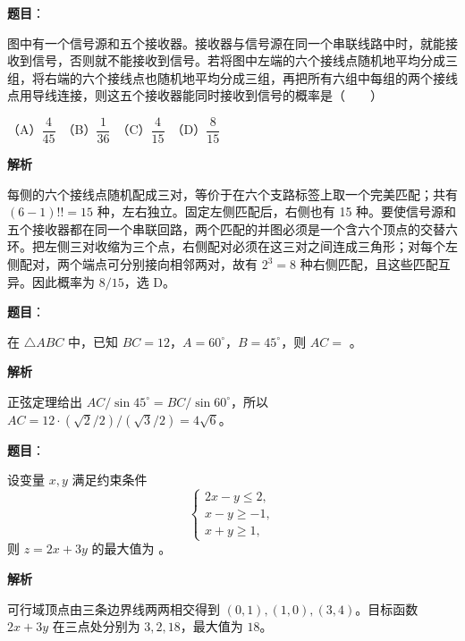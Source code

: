 \begin{answer}

\textbf{题目}：

图中有一个信号源和五个接收器。接收器与信号源在同一个串联线路中时，就能接收到信号，否则就不能接收到信号。若将图中左端的六个接线点随机地平均分成三组，将右端的六个接线点也随机地平均分成三组，再把所有六组中每组的两个接线点用导线连接，则这五个接收器能同时接收到信号的概率是\mbox{（　　）}

（A）$\dfrac{4}{45}$　（B）$\dfrac{1}{36}$　（C）$\dfrac{4}{15}$　（D）$\dfrac{8}{15}$
\nopagebreak[4]
\begin{center}\end{center}
\nopagebreak[4]
\textbf{解析}

每侧的六个接线点随机配成三对，等价于在六个支路标签上取一个完美匹配；共有 $(6-1)!!=15$ 种，左右独立。固定左侧匹配后，右侧也有 15 种。要使信号源和五个接收器都在同一个串联回路，两个匹配的并图必须是一个含六个顶点的交替六环。把左侧三对收缩为三个点，右侧配对必须在这三对之间连成三角形；对每个左侧配对，两个端点可分别接向相邻两对，故有 $2^3=8$ 种右侧匹配，且这些匹配互异。因此概率为 $8/15$，选 D。


\end{answer}
\begin{answer}

\textbf{题目}：

在 $\triangle ABC$ 中，已知 $BC=12$，$A=60^\circ$，$B=45^\circ$，则 $AC=$ \gkblank{}。

\textbf{解析}

正弦定理给出 $AC/\sin45^\circ=BC/\sin60^\circ$，所以 $AC=12\cdot(\sqrt2/2)/(\sqrt3/2)=4\sqrt6$。


\end{answer}
\begin{answer}

\textbf{题目}：

设变量 $x,y$ 满足约束条件
\nopagebreak[4]
\[\begin{cases}2x-y\leqslant2,\\x-y\geqslant-1,\\x+y\geqslant1,\end{cases}\]
则 $z=2x+3y$ 的最大值为 \gkblank{}。

\textbf{解析}

可行域顶点由三条边界线两两相交得到 $(0,1),(1,0),(3,4)$。目标函数 $2x+3y$ 在三点处分别为 $3,2,18$，最大值为 $18$。


\end{answer}
